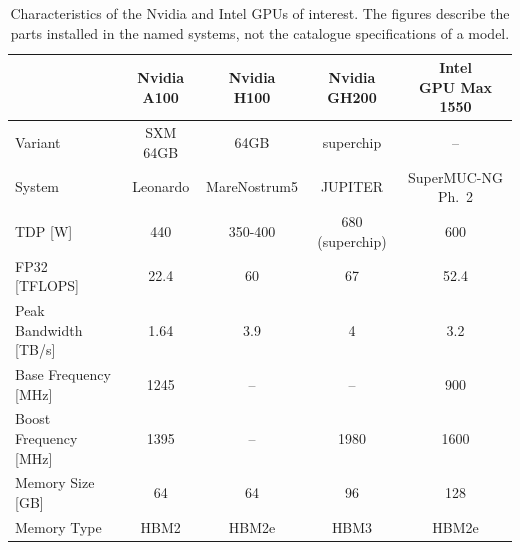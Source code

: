 
\begin{center}
\begin{table}[h!]
\centering
\caption{Characteristics of the Nvidia and Intel GPUs of interest. The figures describe the parts installed in the named systems, not the catalogue specifications of a model.}
\label{tab:nvidia}
\footnotesize
\medskip
\begin{tabular}{l|cccc}
                      & \shortstack{Nvidia\\A100} & \shortstack{Nvidia\\H100} & \shortstack{Nvidia\\GH200} & \shortstack{Intel\\GPU Max 1550} \\ \hline
Variant               & SXM 64GB & 64GB     & superchip       & --     \\
System                & Leonardo & MareNostrum5 & JUPITER     & SuperMUC-NG Ph.~2 \\ \hline
TDP [W]               & 440   & 350-400  & 680 (superchip) & 600    \\
FP32 [TFLOPS]         & 22.4  & 60       & 67              & 52.4   \\
Peak Bandwidth [TB/s]      & 1.64  & 3.9      & 4               & 3.2    \\
Base Frequency [MHz]  & 1245  & --       & --              & 900    \\
Boost Frequency [MHz] & 1395  & --       & 1980            & 1600   \\
Memory Size [GB]      & 64    & 64       & 96              & 128    \\
Memory Type           & HBM2  & HBM2e    & HBM3            & HBM2e  \\
\end{tabular}
\end{table}
\end{center}
